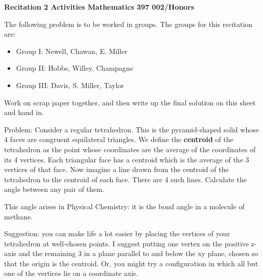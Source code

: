 
\sf
\begin{center}
{\bf Recitation 2 Activities  Mathematics 397 002/Honors }
\end{center}
\bigskip
The following  problem is to be worked in groups. The groups for
this recitation are: 
\begin{itemize}
\item Group I: Newell, Chawan, E. Miller
\item Group II: Hobbs, Willey, Champagne
\item Group III: Davis, S. Miller, Taylor
\end{itemize}

Work on scrap paper together, and then write up the final solution on this
sheet and hand in.
\par
\bigskip
Problem:  Consider a regular tetrahedron. This is the pyramid-shaped solid
whose 4 faces are congruent equilateral triangles. We define the {\bf centroid
} of the tetrahedron as the point whose coordinates are the average of the
coordinates of its 4 vertices. Each triangular face has a centroid which
is the average of the 3 vertices of that face. Now imagine a line drawn 
from the centroid of the tetrahedron to the centroid of each face. There
are 4 such lines. Calculate the angle between any pair of them.
\par
\smallskip
This angle arises in Physical Chemistry: it is the bond angle in a molecule
of methane.
\par
\smallskip
Suggestion: you can make life a lot easier by placing the vertices of your
tetrahedron at well-chosen points. I suggest putting one vertex on the 
positive z-axis and the remaining 3 in a plane parallel to and below the
xy plane, chosen so that  the origin is the centroid. Or, you might try
a configuration in which all but one of the vertices lie on a coordinate
axis.

